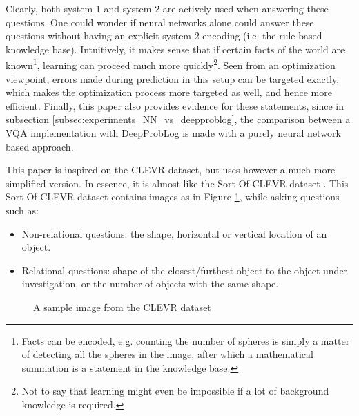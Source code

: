 \documentclass[english]{sobraep}
\begin{document}
Clearly, both system 1 and system 2 are actively used when answering these questions. One could wonder if neural networks alone could answer these questions without having an explicit system 2 encoding (i.e. the rule based knowledge base). Intuitively, it makes sense that if certain facts of the world are known\footnote{Facts can be encoded, e.g. counting the number of spheres is simply a matter of detecting all the spheres in the image, after which a mathematical summation is a statement in the knowledge base.}, learning can proceed much more quickly\footnote{Not to say that learning might even be impossible if a lot of background knowledge is required.}. Seen from an optimization viewpoint, errors made during prediction in this setup can be targeted exactly, which makes the optimization process more targeted as well, and hence more efficient. Finally, this paper also provides evidence for these statements, since in subsection \ref{subsec:experiments_NN_vs_deepproblog}, the comparison between a VQA implementation with DeepProbLog is made with a purely neural network based approach. 

This paper is inspired on the CLEVR dataset, but uses however a much more simplified version. In essence, it is almost like the Sort-Of-CLEVR dataset \cite{sort_of_clevr_dataset}. This Sort-Of-CLEVR dataset contains images as in Figure \ref{fig:sample_image_sort_of_clevr}, while asking questions such as:
\begin{itemize}
    \item Non-relational questions: the shape, horizontal or vertical location of an object.
    \item Relational questions: shape of the closest/furthest object to the object under investigation, or the number of objects with the same shape.
\end{itemize}

\begin{figure}[htp]
    \begin{center}
    \captionsetup{justification=centering}
    \caption{A sample image from the CLEVR dataset \cite{sort_of_clevr_dataset}}
    \label{fig:sample_image_sort_of_clevr}
    \end{center}
\end{figure}
\end{document}
